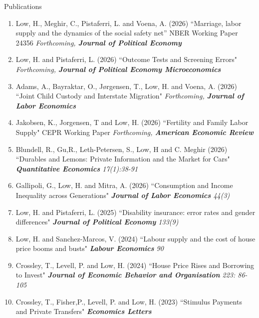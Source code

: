 \documentclass{resume} %
\begin{document}
\begin{rSection}{Publications}
\begin{enumerate}

\item Low, H., Meghir, C., Pistaferri, L. and Voena, A. (2026) ``Marriage, labor supply and the dynamics of the social safety net” NBER Working Paper 24356 \textit{Forthcoming, \textbf{Journal of Political Economy}}

\item Low, H. and Pistaferri, L. (2026) ``Outcome Tests and Screening Errors" \textit{Forthcoming, \textbf{Journal of Political Economy Microeconomics}}

\item Adams, A., Bayraktar, O., Jørgensen, T., Low, H. and Voena, A. (2026) ``Joint Child Custody and Interstate Migration" \textit{Forthcoming, \textbf{Journal of Labor Economics}}

\item Jakobsen, K., Jorgensen, T and Low, H. (2026) ``Fertility and Family Labor Supply" CEPR Working Paper \textit{Forthcoming, \textbf{American Economic Review}}

\item Blundell, R., Gu,R., Leth-Petersen, S., Low, H and C. Meghir (2026)  ``Durables and Lemons: Private Information and the Market for Cars"  \textit{ \textbf{Quantitative Economics} 17(1):38-91}

\item Gallipoli, G., Low, H. and Mitra, A. (2026) ``Consumption and Income Inequality across Generations" \textit{\textbf{ Journal of Labor Economics} 44(3)}

\item Low, H. and Pistaferri, L. (2025) ``Disability insurance: error rates and gender differences" \textit{\textbf{Journal of Political Economy} 133(9)}

\item Low, H. and Sanchez-Marcos, V. (2024) ``Labour supply and the cost of house price booms and busts" \textit{\textbf{Labour Economics} 90} 

\item Crossley, T., Levell, P. and Low, H. (2024) ``House Price Rises and Borrowing to Invest" \textit{\textbf{Journal of Economic Behavior and Organisation} 223: 86-105}

\item Crossley, T., Fisher,P., Levell, P. and Low, H. (2023) ``Stimulus Payments and Private Transfers"  \textit{\textbf{Economics Letters}}


\end{enumerate}
\end{rSection}
\end{document}
